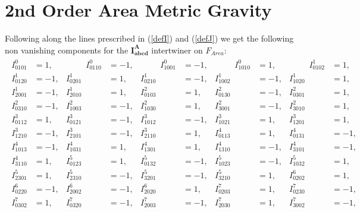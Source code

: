 \documentclass[a4paper,12pt, DIV=14, BCOR=5mm, twoside, headsepline]{scrbook}
\begin{document}
\section{2nd Order Area Metric Gravity}
Following along the lines prescribed in (\ref{defI}) and (\ref{defJ}) we get the following non vanishing components for the $\boldsymbol{I^A_{abcd}}$ intertwiner on $F_{Area}$:
\begin{align}\label{AreaI}
    \begin{alignedat}{5}
   I^{0}_{0101} &= 1,   &  \hspace{1cm} 
I^{0}_{0110} &= -1,   &  \hspace{1cm} 
I^{0}_{1001} &= -1,     &  \hspace{1cm} 
I^{0}_{1010} &= 1,   &  \hspace{1cm} 
I^{1}_{0102} &= 1,   \\  
I^{1}_{0120} &= -1,       &
I^{1}_{0201} &= 1,   &  
I^{1}_{0210} &= -1,   &  
I^{1}_{1002} &= -1,       &
I^{1}_{1020} &= 1,   \\
I^{1}_{2001} &= -1,   &  
I^{1}_{2010} &= 1,       &
I^{2}_{0103} &= 1,   &  
I^{2}_{0130} &= -1,   &  
I^{2}_{0301} &= 1,       \\
I^{2}_{0310} &= -1,   &  
I^{2}_{1003} &= -1,   &  
I^{2}_{1030} &= 1,       &
I^{2}_{3001} &= -1,   &  
I^{2}_{3010} &= 1,  \\  
I^{3}_{0112} &= 1,       &
I^{3}_{0121} &= -1,   &  
I^{3}_{1012} &= -1,   &  
I^{3}_{1021} &= 1,       &
I^{3}_{1201} &= 1,   \\  
I^{3}_{1210} &= -1,   &  
I^{3}_{2101} &= -1,       &
I^{3}_{2110} &= 1,   &  
I^{4}_{0113} &= 1,   &  
I^{4}_{0131} &= -1,       \\
I^{4}_{1013} &= -1,   &  
I^{4}_{1031} &= 1,   &  
I^{4}_{1301} &= 1,       &
I^{4}_{1310} &= -1,   &  
I^{4}_{3101} &= -1,   \\  
I^{4}_{3110} &= 1,       &
I^{5}_{0123} &= 1,   &  
I^{5}_{0132} &= -1,   &  
I^{5}_{1023} &= -1,       &
I^{5}_{1032} &= 1,   \\  
I^{5}_{2301} &= 1,   &  
I^{5}_{2310} &= -1,       &
I^{5}_{3201} &= -1,   &  
I^{5}_{3210} &= 1,   &  
I^{6}_{0202} &= 1,       \\
I^{6}_{0220} &= -1,   &  
I^{6}_{2002} &= -1,   &  
I^{6}_{2020} &= 1,       &
I^{7}_{0203} &= 1,   &  
I^{7}_{0230} &= -1,   \\  
I^{7}_{0302} &= 1,       &
I^{7}_{0320} &= -1,   &  
I^{7}_{2003} &= -1,   &  
I^{7}_{2030} &= 1,       &
I^{7}_{3002} &= -1,   \\  

\end{alignedat}
\end{align}
\end{document}

